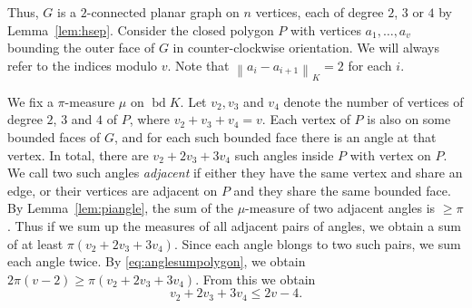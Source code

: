 \documentclass[a4paper,12pt]{article}
\theoremstyle{plain}
\theoremstyle{definition}
\DeclareMathOperator{\bd}{bd}
\newcommand{\norm}[2][]{\left\lVert#2\right\rVert_{#1}}
\begin{document}
Thus, $G$ is a $2$-connected planar graph on $n$ vertices, each of 
degree $2$, $3$ or $4$ by Lemma~\ref{lem:hsep}.
Consider the closed polygon $P$ with vertices $a_1,\ldots,a_v$ 
bounding the outer face of $G$ in counter-clockwise orientation.
We will always refer to the indices modulo 
$v$.
Note that $\norm[K]{a_i-a_{i+1}}=2$ for each $i$.

We fix a $\pi$-measure $\mu$ on $\bd K$.
Let $v_2, v_3$ and $v_4$ denote the number of vertices of degree $2$, $3$ and $4$ of 
$P$, where $v_2+v_3+v_4=v$.
Each vertex of $P$ is also on some bounded faces of $G$, and for each such bounded face there is an angle at that vertex.
In total, there are $v_2+2v_3+3v_4$ such angles inside $P$ with vertex on $P$.
We call two such angles \emph{adjacent} if either they have the same vertex and share an edge, or their vertices are adjacent on $P$ and they share the same bounded face.
By Lemma~\ref{lem:piangle}, the sum of the $\mu$-measure of two adjacent angles is $\geq\pi$.
Thus if we sum up the measures of all adjacent pairs of angles, we obtain a sum of at least $\pi(v_2+2v_3+3v_4)$.
Since each angle blongs to two such pairs, we sum each angle twice.
By \eqref{eq:anglesumpolygon}, we obtain $2\pi(v-2)\geq\pi(v_2+2v_3+3v_4)$.
From this we obtain
\begin{equation}\label{eq:anglesum}
 v_2+2v_3+3v_4\leq 2v-4.
\end{equation}
\end{document}
